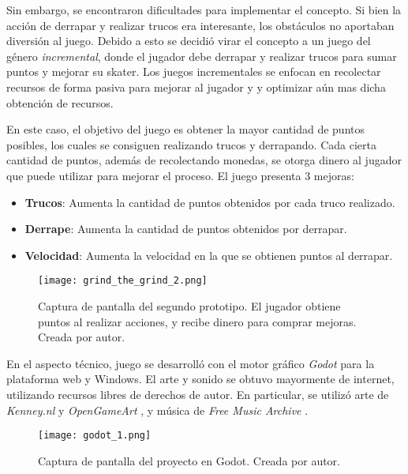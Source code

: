 \par Sin embargo, se encontraron dificultades para implementar el concepto. Si bien la acción de derrapar y realizar trucos era interesante, los obstáculos no aportaban diversión al juego. Debido a esto se decidió virar el concepto a un juego del género \textit{incremental}, donde el jugador debe derrapar y realizar trucos para sumar puntos y mejorar su skater. Los juegos incrementales se enfocan en recolectar recursos de forma pasiva para mejorar al jugador y y optimizar aún mas dicha obtención de recursos.
\par En este caso, el objetivo del juego es obtener la mayor cantidad de puntos posibles, los cuales se consiguen realizando trucos y derrapando. Cada cierta cantidad de puntos, además de recolectando monedas, se otorga dinero al jugador que puede utilizar para mejorar el proceso. El juego presenta 3 mejoras:
\begin{itemize}
    \item \textbf{Trucos}: Aumenta la cantidad de puntos obtenidos por cada truco realizado.
    \item \textbf{Derrape}: Aumenta la cantidad de puntos obtenidos por derrapar.
    \item \textbf{Velocidad}: Aumenta la velocidad en la que se obtienen puntos al derrapar.
\end{itemize}
\begin{figure}[H]
  \centering
  \texttt{[image: grind\_the\_grind\_2.png]}
  \caption{Captura de pantalla del segundo prototipo. El jugador obtiene puntos al realizar acciones, y recibe dinero para comprar mejoras. Creada por autor.}
  \label{fig:x grind the grind 2} 
\end{figure}
\par En el aspecto técnico, juego se desarrolló con el motor gráfico \textit{Godot} para la plataforma web y Windows. El arte y sonido se obtuvo mayormente de internet, utilizando recursos libres de derechos de autor. En particular, se utilizó arte de \textit{Kenney.nl} \cite{kenneyHomeKenney} y \textit{OpenGameArt} \cite{OpenGameArtorg}, y música de \textit{Free Music Archive} \cite{RoyaltyFreeMusic}.
\begin{figure}[H]
  \centering
  \texttt{[image: godot\_1.png]}
  \caption{Captura de pantalla del proyecto en Godot. Creada por autor.}
  \label{fig:x godot 1} 
\end{figure}

